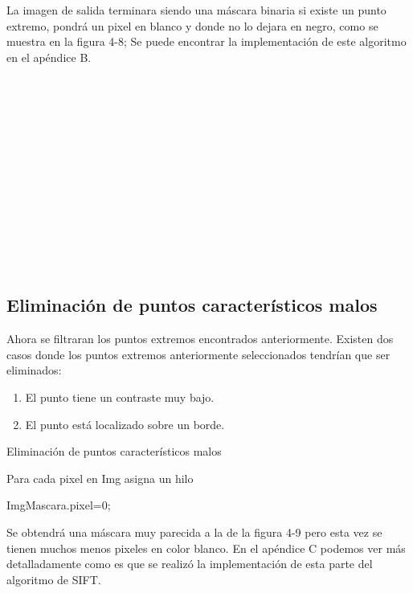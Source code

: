 La imagen de salida terminara siendo una máscara binaria si existe un punto extremo, pondrá un pixel en blanco y donde no lo dejara en negro, como se muestra en la figura 4-8; Se puede encontrar la implementación de este algoritmo en el apéndice B. \\\\\\\\\\\\\\\\\\\\\\\\\\\






\subsection{Eliminación de puntos característicos malos}

Ahora se filtraran los puntos extremos encontrados anteriormente. Existen dos casos donde los puntos extremos anteriormente seleccionados tendrían que ser eliminados:
	\begin{enumerate}
		\item El punto tiene un contraste muy bajo.
		\item El punto está localizado sobre un borde.
	\end{enumerate}		

\begin{algorithm}[H]
\caption{Eliminación de puntos característicos malos}
 Para cada pixel en Img asigna un hilo\;
 
 {
	{
		{
			ImgMascara.pixel=0;
		}
	
				
	}
	
	
		
}
	
\end{algorithm}

Se obtendrá una máscara muy parecida a la de la figura 4-9 pero esta vez se tienen muchos menos pixeles en color blanco. En el apéndice C podemos ver más detalladamente como es que se realizó la implementación de esta parte del algoritmo de SIFT.

